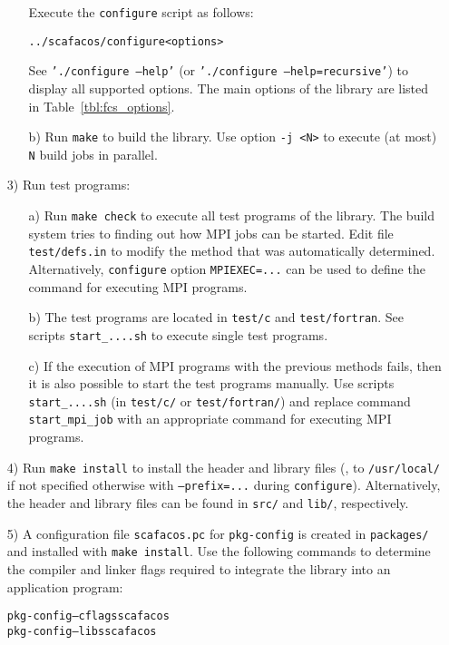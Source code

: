 \begin{enumerate}
\begin{enumerate}
Execute the \texttt{configure} script as follows:
\begin{alltt}
  ../scafacos/configure <options>
\end{alltt}

See \texttt{'./configure --help'} (or \texttt{'./configure --help=recursive'}) to display all supported options.
The main options of the library are listed in Table~\ref{tbl:fcs_options}.

  \item[b)]
Run \texttt{make} to build the library.
Use option \texttt{-j <N>} to execute (at most) \texttt{N} build jobs in parallel.
  \end{enumerate}

  \item[3)] Run test programs:
  \begin{enumerate}
    \item[a)]
Run \texttt{make check} to execute all test programs of the library.
The build system tries to finding out how MPI jobs can be started.
Edit file \texttt{test/defs.in} to modify the method that was automatically determined.
Alternatively, \texttt{configure} option \texttt{MPIEXEC=...} can be used to define the command for executing MPI programs.

    \item[b)]
The test programs are located in \texttt{test/c} and \texttt{test/fortran}.
See scripts \texttt{start\_....sh} to execute single test programs.

    \item[c)]
If the execution of MPI programs with the previous methods fails, then it is also possible to start the test programs manually.
Use scripts \texttt{start\_....sh} (in \texttt{test/c/} or \texttt{test/fortran/}) and replace command \texttt{start\_mpi\_job} with an appropriate command for executing MPI programs.
  \end{enumerate}

  \item[4)]
Run \texttt{make install} to install the header and library files (\ie, to \texttt{/usr/local/} if not specified otherwise with \texttt{--prefix=...} during \texttt{configure}).
Alternatively, the header and library files can be found in \texttt{src/} and \texttt{lib/}, respectively.

  \item[5)]
A configuration file \texttt{scafacos.pc} for \texttt{pkg-config} is created in \texttt{packages/} and installed with \texttt{make install}.
Use the following commands to determine the compiler and linker flags required to integrate the library into an application program:
\begin{alltt}
  pkg-config --cflags scafacos
  pkg-config --libs scafacos
\end{alltt}

\end{enumerate}


